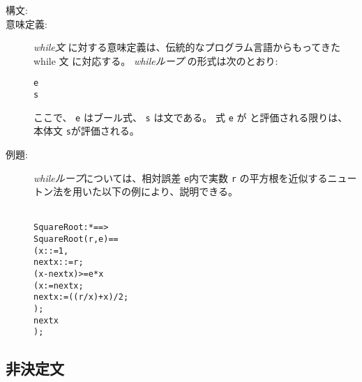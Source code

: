 \documentclass[\pformat,12pt]{jarticle}
\begin{document}
\begin{description}
\item[構文:]
  

\item[意味定義:]  {\it while文} に対する意味定義は、伝統的なプログラム言語からもってきた while 文 に対応する。
 {\it whileループ\/} の形式は次のとおり:
  \begin{alltt}
     e 
      s
  \end{alltt}
ここで、 {\tt e} はブール式、 {\tt s} は文である。
式 {\tt e} が  と評価される限りは、本体文 {\tt    s}が評価される。

\item[例題:] {\it whileループ}については、相対誤差 \texttt{e}内で実数 \texttt{r} の平方根を近似するニュートン法を用いた以下の例により、説明できる。
  \begin{alltt}\label{squarerootDef}
  SquareRoot :  *  ==> 
  SquareRoot (r,e) ==
    ( x: := 1,
        nextx: := r;
       (x - nextx) >= e * x 
       ( x := nextx;
         nextx := ((r / x) + x) / 2;
       );
      nextx
    );
  \end{alltt}
\end{description}

\subsection{非決定文}
\end{document}
